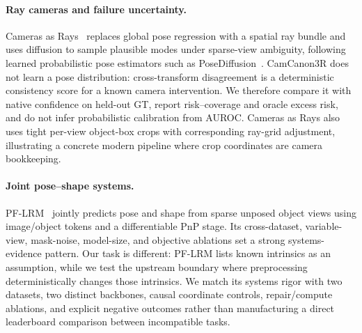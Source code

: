 \paragraph{Ray cameras and failure uncertainty.}
Cameras as Rays~\cite{zhang2024cameras} replaces global pose regression with a
spatial ray bundle and uses diffusion to sample plausible modes under
sparse-view ambiguity, following learned probabilistic pose estimators such as
PoseDiffusion~\cite{wang2023posediffusion}.  CamCanon3R does not learn a pose distribution:
cross-transform disagreement is a deterministic consistency score for a known
camera intervention.  We therefore compare it with native confidence on
held-out GT, report risk--coverage and oracle excess risk, and do not infer
probabilistic calibration from AUROC.  Cameras as Rays also uses tight
per-view object-box crops with corresponding ray-grid adjustment, illustrating
a concrete modern pipeline where crop coordinates are camera bookkeeping.

\paragraph{Joint pose--shape systems.}
PF-LRM~\cite{wang2024pflrm} jointly predicts pose and shape from sparse unposed
object views using image/object tokens and a differentiable PnP stage.  Its
cross-dataset, variable-view, mask-noise, model-size, and objective ablations
set a strong systems-evidence pattern.  Our task is different: PF-LRM lists
known intrinsics as an assumption, while we test the upstream boundary where
preprocessing deterministically changes those intrinsics.  We match its
systems rigor with two datasets, two distinct backbones, causal coordinate
controls, repair/compute ablations, and explicit negative outcomes rather than
manufacturing a direct leaderboard comparison between incompatible tasks.
